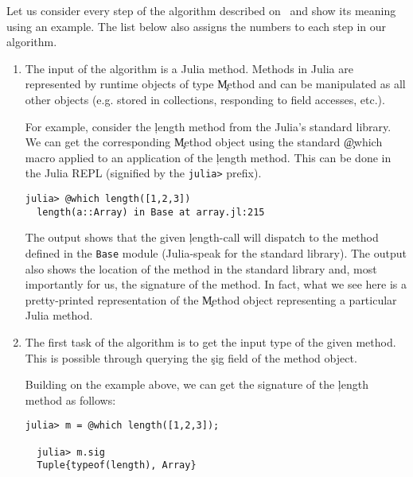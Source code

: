 Let us consider every step of the algorithm described
on~ and show its meaning using an example.
The list below also assigns the numbers to each step in our algorithm.
\begin{enumerate}

  \item The input of the algorithm is a Julia method. Methods in Julia are
  represented by runtime objects of type \c{Method} and can be manipulated as
  all other objects (e.g. stored in collections, responding to field accesses, etc.).

  For example, consider the \c{length} method from the Julia's standard library. We can
  get the corresponding \c{Method} object using the standard \c{@which} macro
  applied to an application of the \c{length} method. This can be done in the
  Julia REPL (signified by the \texttt{julia>} prefix).

\begin{minipage}{.92\textwidth}
\begin{lstlisting}[style=jterm]
  julia> @which length([1,2,3])
  length(a::Array) in Base at array.jl:215
\end{lstlisting}
\end{minipage}

  The output shows that the given \c{length}-call will dispatch to the
  method defined in the \texttt{Base} module (Julia-speak for the standard
  library). The output also shows the location of the method in the
  standard library and, most importantly for us, the signature of the
  method. In fact, what we see here is a pretty-printed representation of
  the \c{Method} object representing a particular Julia method.

  \item The first task of the algorithm is to get the input type of the given
  method. This is possible through querying the \c{sig} field of the method object.

  Building on the example above, we can get the signature of the \c{length}
  method as follows:

\begin{minipage}{.92\textwidth}
\begin{lstlisting}[style=jterm]
  julia> m = @which length([1,2,3]);

  julia> m.sig
  Tuple{typeof(length), Array}
\end{lstlisting}
\end{minipage}


\end{enumerate}
